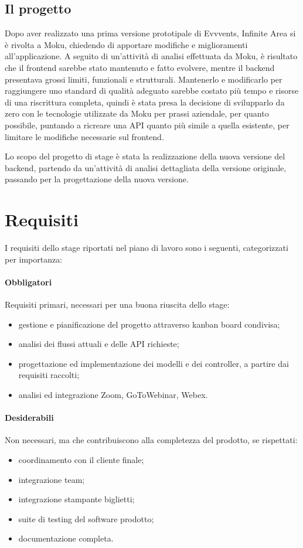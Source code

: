 \subsection{Il progetto}
Dopo aver realizzato una prima versione prototipale di Evvvents, Infinite Area si è rivolta a Moku, chiedendo di apportare modifiche e miglioramenti all'applicazione. A seguito di un'attività di analisi effettuata da Moku, è risultato che il frontend sarebbe stato mantenuto e fatto evolvere, mentre il backend presentava grossi limiti, funzionali e strutturali. Mantenerlo e modificarlo per raggiungere uno standard di qualità adeguato sarebbe costato più tempo e risorse di una riscrittura completa, quindi è stata presa la decisione di svilupparlo da zero con le tecnologie utilizzate da Moku per prassi aziendale, per quanto possibile, puntando a ricreare una API quanto più simile a quella esistente, per limitare le modifiche necessarie sul frontend.

Lo scopo del progetto di stage è stata la realizzazione della nuova versione del backend, partendo da un'attività di analisi dettagliata della versione originale, passando per la progettazione della nuova versione.


\section{Requisiti} \label{stage:requisiti}
I requisiti dello stage riportati nel piano di lavoro sono i seguenti, categorizzati per importanza:

\paragraph{Obbligatori} Requisiti primari, necessari per una buona riuscita dello stage:
\begin{itemize}
	\item gestione e pianificazione del progetto attraverso kanban board condivisa;
	\item analisi dei flussi attuali e delle API richieste;
	\item progettazione ed implementazione dei modelli e dei controller, a partire dai requisiti raccolti;
	\item analisi ed integrazione Zoom, GoToWebinar, Webex.
\end{itemize}

\paragraph{Desiderabili} Non necessari, ma che contribuiscono alla completezza del prodotto, se rispettati:
\begin{itemize}
	\item coordinamento con il cliente finale;
	\item integrazione team;
	\item integrazione stampante biglietti;
	\item suite di testing del software prodotto;
	\item documentazione completa.
\end{itemize}

